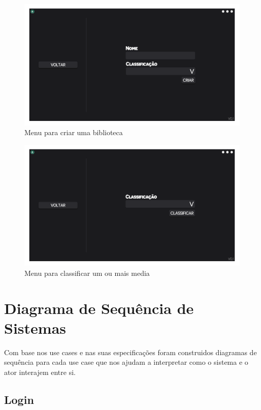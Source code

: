 \documentclass[a4paper]{report}
\begin{document}
\begin{figure}[H]
	\centering 
    \includegraphics[width=\textwidth]{images/Criar_Biblioteca_Menu.png}  
    \caption{Menu para criar uma biblioteca}
\end{figure}

\begin{figure}[H]
	\centering 
    \includegraphics[width=\textwidth]{images/Classificar_Menu.png}  
    \caption{Menu para classificar um ou mais media}
\end{figure}

\chapter{Diagrama de Sequência de Sistemas}

Com base nos use cases e nas suas especificações foram construidos diagramas de sequência
para cada use case que nos ajudam a interpretar como o sistema e o ator interajem entre
si.

\section{Login}
\end{document}
